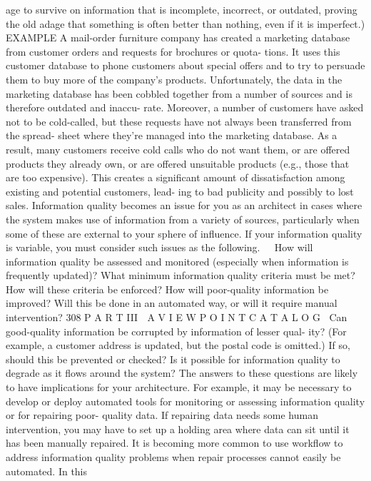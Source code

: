 age to survive on information that is incomplete, incorrect, or outdated,
proving the old adage that something is often better than nothing, even if it
is imperfect.)
EXAMPLE A mail-order furniture company has created a marketing
database from customer orders and requests for brochures or quota-
tions. It uses this customer database to phone customers about special
offers and to try to persuade them to buy more of the company’s
products.
Unfortunately, the data in the marketing database has been cobbled
together from a number of sources and is therefore outdated and inaccu-
rate. Moreover, a number of customers have asked not to be cold-called,
but these requests have not always been transferred from the spread-
sheet where they’re managed into the marketing database.
As a result, many customers receive cold calls who do not want them,
or are offered products they already own, or are offered unsuitable
products (e.g., those that are too expensive). This creates a significant
amount of dissatisfaction among existing and potential customers, lead-
ing to bad publicity and possibly to lost sales.
Information quality becomes an issue for you as an architect in cases where
the system makes use of information from a variety of sources, particularly
when some of these are external to your sphere of influence. If your information
quality is variable, you must consider such issues as the following.
How will information quality be assessed and monitored (especially
when information is frequently updated)?
What minimum information quality criteria must be met?
How will these criteria be enforced?
How will poor-quality information be improved? Will this be done in an
automated way, or will it require manual intervention?
308
 P A R T III  A V I E W P O I N T C A T A L O G
Can good-quality information be corrupted by information of lesser qual-
ity? (For example, a customer address is updated, but the postal code is
omitted.) If so, should this be prevented or checked?
Is it possible for information quality to degrade as it flows around the
system?
The answers to these questions are likely to have implications for your
architecture. For example, it may be necessary to develop or deploy automated
tools for monitoring or assessing information quality or for repairing poor-
quality data. If repairing data needs some human intervention, you may have
to set up a holding area where data can sit until it has been manually repaired.
It is becoming more common to use workflow to address information
quality problems when repair processes cannot easily be automated. In this
